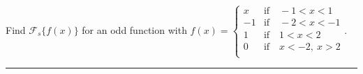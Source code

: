 \documentclass[10pt]{article}
\begin{document}
\newpage

\section{\underline{}}
\label{sec: Problem 2}
\noindent
Find $ \mathcal{F}_s\{f(x)\} $ for an odd function with $ f(x)=\left\{\begin{array}{ll}
    x & \mbox{if} \quad -1 < x < 1\\
    -1 & \mbox{if} \quad -2 < x < -1\\
    1 & \mbox{if} \quad 1 < x < 2\\
    0 & \mbox{if} \quad x < -2, \ x > 2 \\
\end{array}
\right. $.  \\
\vspace{2.5mm}
\hrule 

\vspace{7.5mm}
\end{document}
